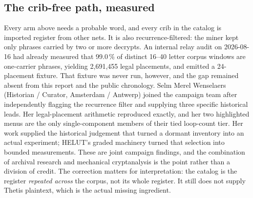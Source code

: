\documentclass[11pt,a4paper]{article}
\begin{document}
\subsection{The crib-free path, measured}

Every arm above needs a probable word, and every crib in the catalog is imported
register from other nets.
It is also recurrence-filtered: the miner kept only phrases carried by two or more decrypts.
An internal relay audit on 2026-08-16 had already measured that 99.0\,\% of distinct 16--40
letter corpus windows are one-carrier phrases, yielding 2{,}691{,}455 legal placements, and
emitted a 24-placement fixture. That fixture was never run, however, and the gap remained absent
from this report and the public chronology.
Selm Merel Wenselaers (Historian / Curator, Amsterdam / Antwerp) joined the campaign team after independently flagging the recurrence filter and supplying three specific historical leads. Her legal-placement arithmetic reproduced exactly, and her two highlighted menus are the only single-component members of their tied loop-count tier. Her work supplied the historical judgement that turned a dormant inventory into an actual experiment; HELUT's graded machinery turned that selection into bounded measurements. These are joint campaign findings, and the combination of archival research and mechanical cryptanalysis is the point rather than a division of credit.
The correction matters for interpretation: the catalog is the register \emph{repeated across}
the corpus, not its whole register. It still does not supply Thetis plaintext, which is the
actual missing ingredient.
\end{document}

